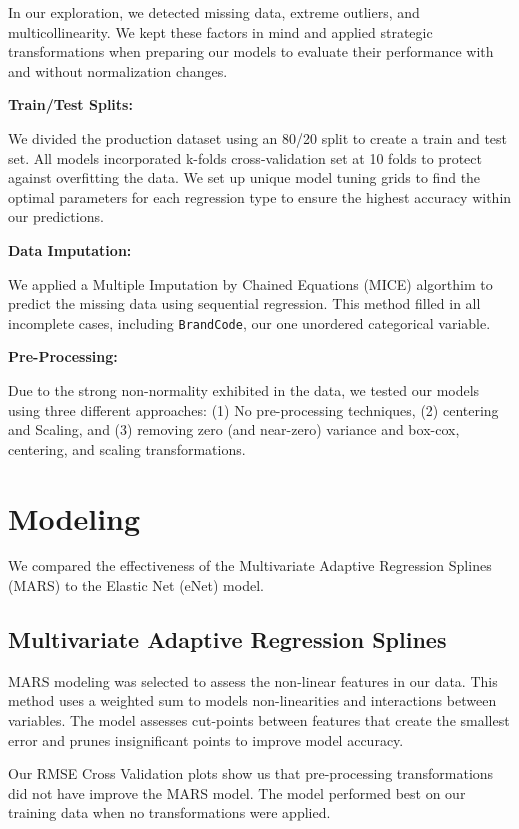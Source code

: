 \documentclass[]{report}
\begin{document}
In our exploration, we detected missing data, extreme outliers, and
multicollinearity. We kept these factors in mind and applied strategic
transformations when preparing our models to evaluate their performance
with and without normalization changes.

\textbf{Train/Test Splits:}

We divided the production dataset using an 80/20 split to create a train
and test set. All models incorporated k-folds cross-validation set at 10
folds to protect against overfitting the data. We set up unique model
tuning grids to find the optimal parameters for each regression type to
ensure the highest accuracy within our predictions.

\textbf{Data Imputation:}

We applied a Multiple Imputation by Chained Equations (MICE) algorthim
to predict the missing data using sequential regression. This method
filled in all incomplete cases, including \texttt{BrandCode}, our one
unordered categorical variable.

\textbf{Pre-Processing:}

Due to the strong non-normality exhibited in the data, we tested our
models using three different approaches: (1) No pre-processing
techniques, (2) centering and Scaling, and (3) removing zero (and
near-zero) variance and box-cox, centering, and scaling transformations.

\hypertarget{modeling}{%
\chapter{Modeling}\label{modeling}}

We compared the effectiveness of the Multivariate Adaptive Regression
Splines (MARS) to the Elastic Net (eNet) model.

\hypertarget{multivariate-adaptive-regression-splines}{%
\section{Multivariate Adaptive Regression
Splines}\label{multivariate-adaptive-regression-splines}}

MARS modeling was selected to assess the non-linear features in our
data. This method uses a weighted sum to models non-linearities and
interactions between variables. The model assesses cut-points between
features that create the smallest error and prunes insignificant points
to improve model accuracy.

Our RMSE Cross Validation plots show us that pre-processing
transformations did not have improve the MARS model. The model performed
best on our training data when no transformations were applied.
\end{document}
